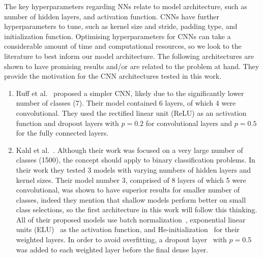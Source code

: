 The key hyperparameters regarding NNs relate to model architecture, such as
number of hidden layers, and activation function. CNNs have further
hyperparameters to tune, such as kernel size and stride, padding type, and
initialization function. Optimising hyperparameters for CNNs can take a
considerable amount of time and computational resources, so we look to the
literature to best inform our model architecture. The following architectures are
shown to have promising results and/or are related to the problem at hand. They
provide the motivation for the CNN architectures tested in this work.

\begin{enumerate}

  \item Ruff et al.~\cite{ruff2020automated} proposed a simpler CNN, likely
    due to the significantly lower number of classes (7). Their model contained
    6 layers, of which 4 were convolutional. They used the rectified linear unit
    (ReLU) as an activation function and dropout layers with $p=0.2$ for
    convolutional layers and $p=0.5$ for the fully connected layers.

  \item Kahl et al.~\cite{kahl2017large}. Although their work was focused on a
    very large number of classes (1500), the concept should apply to binary
    classification problems. In their work they tested 3 models with varying
    numbers of hidden layers and kernel sizes. Their model number 3, comprised
    of 8 layers of which 5 were convolutional, was shown to have superior
    results for smaller number of classes, indeed they mention that shallow
    models perform better on small class selections, so the first architecture
    in this work will follow this thinking. All of their proposed models use
    batch normalization~\cite{ioffe2015batch}, exponential linear units
    (ELU)~\cite{clevert2015fast} as the activation function, and
    He-initialization~\cite{he2015delving} for their weighted layers. In order
    to avoid overfitting, a dropout layer~\cite{srivastava2014dropout} with
    $p=0.5$ was added to each weighted layer before the final dense layer.


\end{enumerate}


